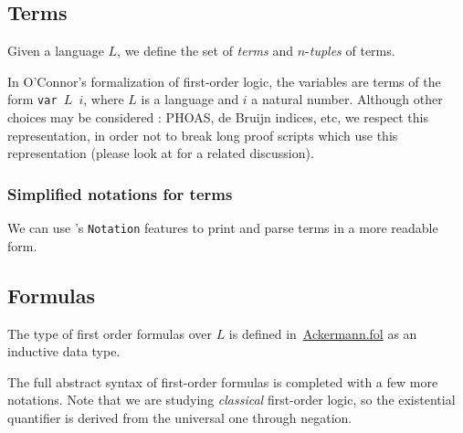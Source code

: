 \subsection{Terms}

Given a language $L$, we define the set of \emph{terms} and
$n$-\emph{tuples} of terms. 







\begin{remark}[Variables]
In O'Connor's formalization of first-order logic, the variables are \gallina terms of the form \texttt{var $L$ $i$}, where $L$ is
 a language and $i$ a natural number. 
Although other choices may be considered : PHOAS, de Bruijn indices, etc,  we   respect this representation, in order not to break long proof scripts which use this representation (please look at \cite{OConnor05} for a related discussion).
  
\end{remark}

\subsubsection{Simplified notations for terms}
\label{sec:fol-term-notations}

 We can use \coq's \texttt{Notation} features to print and parse terms in a more readable form.







\subsection{Formulas}



The type of first order formulas over $L$ is defined 
in~\href{../theories/html/hydras.Ackermann.fol.html}{Ackermann.fol} as an inductive data type.


The full abstract syntax of first-order formulas is completed 
with a few more notations. Note that we are studying \emph{classical} first-order logic, so the existential quantifier is derived from the universal one through negation. 

